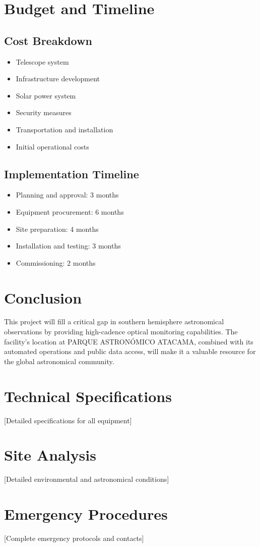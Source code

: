 \documentclass{article}
\begin{document}
\section{Budget and Timeline}

\subsection{Cost Breakdown}
\begin{itemize}
    \item Telescope system
    \item Infrastructure development
    \item Solar power system
    \item Security measures
    \item Transportation and installation
    \item Initial operational costs
\end{itemize}

\subsection{Implementation Timeline}
\begin{itemize}
    \item Planning and approval: 3 months
    \item Equipment procurement: 6 months
    \item Site preparation: 4 months
    \item Installation and testing: 3 months
    \item Commissioning: 2 months
\end{itemize}

\section{Conclusion}
This project will fill a critical gap in southern hemisphere astronomical observations by providing high-cadence optical monitoring capabilities. The facility's location at PARQUE ASTRONÓMICO ATACAMA, combined with its automated operations and public data access, will make it a valuable resource for the global astronomical community.

\appendix
\section{Technical Specifications}
[Detailed specifications for all equipment]

\section{Site Analysis}
[Detailed environmental and astronomical conditions]

\section{Emergency Procedures}
[Complete emergency protocols and contacts]
\end{document}
